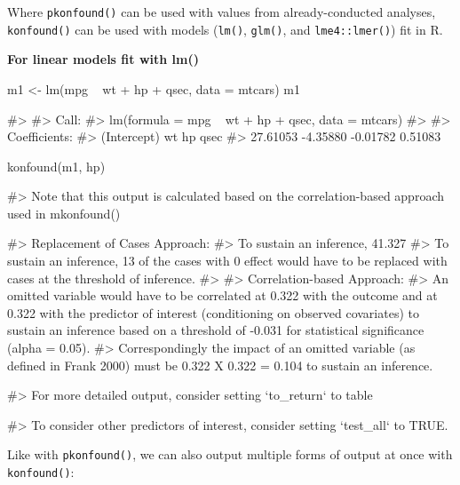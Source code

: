 Where \texttt{pkonfound()} can be used with values from
already-conducted analyses, \texttt{konfound()} can be used with models
(\texttt{lm()}, \texttt{glm()}, and \texttt{lme4::lmer()}) fit in R.

\textbf{For linear models fit with lm()}

\begin{Schunk}
\begin{Sinput}
m1 <- lm(mpg ~ wt + hp + qsec, data = mtcars)
m1
\end{Sinput}
\begin{Soutput}
#> 
#> Call:
#> lm(formula = mpg ~ wt + hp + qsec, data = mtcars)
#> 
#> Coefficients:
#> (Intercept)           wt           hp         qsec  
#>    27.61053     -4.35880     -0.01782      0.51083
\end{Soutput}
\begin{Sinput}

konfound(m1, hp)
\end{Sinput}
\begin{Soutput}
#> Note that this output is calculated based on the correlation-based approach used in mkonfound()
\end{Soutput}
\begin{Soutput}
#> Replacement of Cases Approach:
#> To sustain an inference, 41.327% of the estimate would have to be due to bias. This is based on a threshold of -0.031 for statistical significance (alpha = 0.05).
#> To sustain an inference, 13 of the cases with 0 effect would have to be replaced with cases at the threshold of inference.
#> 
#> Correlation-based Approach:
#> An omitted variable would have to be correlated at 0.322 with the outcome and at 0.322 with the predictor of interest (conditioning on observed covariates) to sustain an inference based on a threshold of -0.031 for statistical significance (alpha = 0.05).
#> Correspondingly the impact of an omitted variable (as defined in Frank 2000) must be 0.322 X 0.322 = 0.104 to sustain an inference.
\end{Soutput}
\begin{Soutput}
#> For more detailed output, consider setting `to_return` to table
\end{Soutput}
\begin{Soutput}
#> To consider other predictors of interest, consider setting `test_all` to TRUE.
\end{Soutput}
\end{Schunk}

Like with \texttt{pkonfound()}, we can also output multiple forms of
output at once with \texttt{konfound()}:

